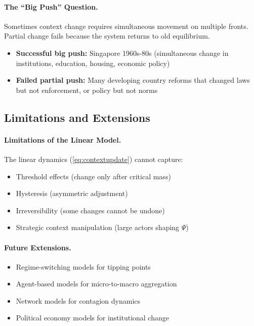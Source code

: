\documentclass[12pt,a4paper]{article}
\begin{document}
\paragraph{The ``Big Push'' Question.}
Sometimes context change requires simultaneous movement on multiple fronts.
Partial change fails because the system returns to old equilibrium.

\begin{itemize}
  \item \textbf{Successful big push:} Singapore 1960s-80s (simultaneous change in 
        institutions, education, housing, economic policy)
  \item \textbf{Failed partial push:} Many developing country reforms that changed 
        laws but not enforcement, or policy but not norms
\end{itemize}

\subsection{Limitations and Extensions}

\paragraph{Limitations of the Linear Model.}
The linear dynamics (\ref{eq:contextupdate}) cannot capture:
\begin{itemize}
  \item Threshold effects (change only after critical mass)
  \item Hysteresis (asymmetric adjustment)
  \item Irreversibility (some changes cannot be undone)
  \item Strategic context manipulation (large actors shaping $\Psi$)
\end{itemize}

\paragraph{Future Extensions.}
\begin{itemize}
  \item Regime-switching models for tipping points
  \item Agent-based models for micro-to-macro aggregation
  \item Network models for contagion dynamics
  \item Political economy models for institutional change
\end{itemize}
\end{document}
